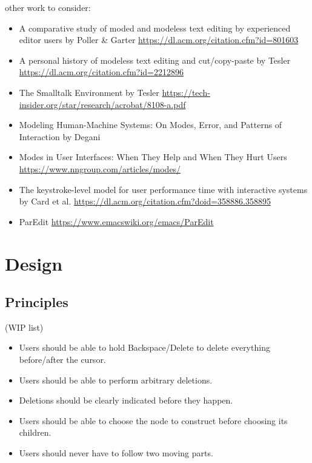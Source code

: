 \documentclass[runningheads]{llncs}
\begin{document}
other work to consider:
\begin{itemize}
\item A comparative study of moded and modeless text editing by experienced editor users by Poller \& Garter \url{https://dl.acm.org/citation.cfm?id=801603}
\item A personal history of modeless text editing and cut/copy-paste by Tesler \url{https://dl.acm.org/citation.cfm?id=2212896}
\item The Smalltalk Environment by Tesler \url{https://tech-insider.org/star/research/acrobat/8108-a.pdf}
\item Modeling Human-Machine Systems: On Modes, Error, and Patterns of Interaction by Degani %
\item Modes in User Interfaces: When They Help and When They Hurt Users \url{https://www.nngroup.com/articles/modes/}
\item The keystroke-level model for user performance time with interactive systems by Card et al. \url{https://dl.acm.org/citation.cfm?doid=358886.358895}
\item ParEdit \url{https://www.emacswiki.org/emacs/ParEdit}
\end{itemize}


\section{Design} \label{sec:design}

\subsection{Principles}

(WIP list)
\begin{itemize}
\item Users should be able to hold Backspace/Delete to delete everything before/after the cursor.
\item Users should be able to perform arbitrary deletions.
\item Deletions should be clearly indicated before they happen.
\item Users should be able to choose the node to construct before choosing its children.
\item Users should never have to follow two moving parts.
\end{itemize}
\end{document}
